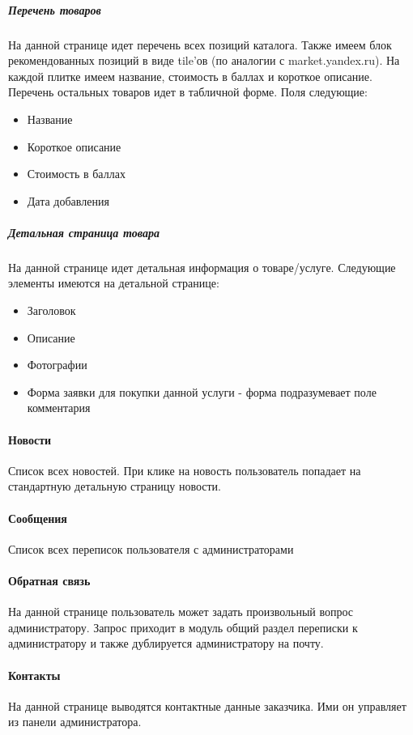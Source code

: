 \documentclass[DIV=calc, paper=a4, fontsize=11pt]{scrartcl} %
\begin{document}
\subparagraph{Перечень товаров}
На данной странице идет перечень всех позиций каталога.
Также имеем блок рекомендованных позиций в виде tile'ов (по аналогии с market.yandex.ru). На каждой плитке имеем название, стоимость в баллах и короткое описание.
\\[0.5cm]
Перечень остальных товаров идет в табличной форме. Поля следующие:

\begin{itemize}
	\item Название
	\item Короткое описание
	\item Стоимость в баллах
	\item Дата добавления
\end{itemize}

\subparagraph{Детальная страница товара}
На данной странице идет детальная информация о товаре/услуге. Следующие элементы имеются на детальной странице:

\begin{itemize}
	\item Заголовок
	\item Описание
	\item Фотографии
	\item Форма заявки для покупки данной услуги - форма подразумевает поле комментария
\end{itemize}

\paragraph{Новости}
Список всех новостей. При клике на новость пользователь попадает на стандартную детальную страницу новости.

\paragraph{Сообщения}
Список всех переписок пользователя с администраторами

\paragraph{Обратная связь}
На данной странице пользователь может задать произвольный вопрос администратору. Запрос приходит в модуль общий раздел переписки к администратору и также дублируется администратору на почту.

\paragraph{Контакты}
На данной странице выводятся контактные данные заказчика. Ими он управляет из панели администратора.
\end{document}
